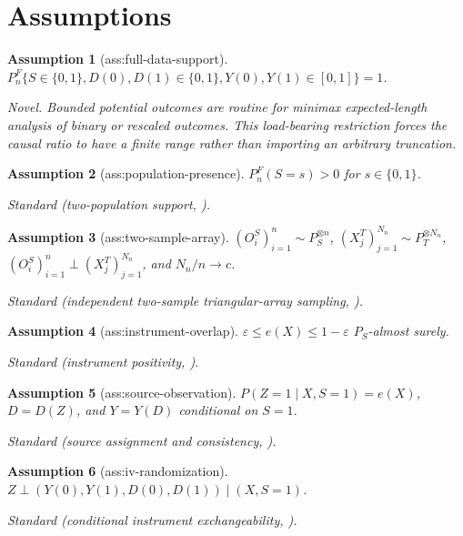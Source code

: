 \documentclass{article}
\newtheorem{assumption}{Assumption}
\begin{document}
\section{Assumptions}

\begin{assumption}[ass:full-data-support]\label{ass:full-data-support}
\(P_n^F\{S\in\{0,1\},D(0),D(1)\in\{0,1\},Y(0),Y(1)\in[0,1]\}=1\).
\par\smallskip\noindent\emph{Novel.} Bounded potential outcomes are routine for minimax expected-length analysis of binary or rescaled outcomes. This load-bearing restriction forces the causal ratio to have a finite range rather than importing an arbitrary truncation.
\end{assumption}

\begin{assumption}[ass:population-presence]\label{ass:population-presence}
\(P_n^F(S=s)>0\) for \(s\in\{0,1\}\).
\par\smallskip\noindent\emph{Standard} (two-population support, \cite{ChenHuang2025}).
\end{assumption}

\begin{assumption}[ass:two-sample-array]\label{ass:two-sample-array}
\((O_i^S)_{i=1}^n\sim P_S^{\otimes n}\), \((X_j^T)_{j=1}^{N_n}\sim P_T^{\otimes N_n}\), \((O_i^S)_{i=1}^n\perp(X_j^T)_{j=1}^{N_n}\), and \(N_n/n\to c\).
\par\smallskip\noindent\emph{Standard} (independent two-sample triangular-array sampling, \cite{ChenHuang2025}).
\end{assumption}

\begin{assumption}[ass:instrument-overlap]\label{ass:instrument-overlap}
\(\varepsilon\le e(X)\le1-\varepsilon\) \(P_S\)-almost surely.
\par\smallskip\noindent\emph{Standard} (instrument positivity, \cite{ChenHuang2025}).
\end{assumption}

\begin{assumption}[ass:source-observation]\label{ass:source-observation}
\(P(Z=1\mid X,S=1)=e(X)\), \(D=D(Z)\), and \(Y=Y(D)\) conditional on \(S=1\).
\par\smallskip\noindent\emph{Standard} (source assignment and consistency, \cite{ChenHuang2025}).
\end{assumption}

\begin{assumption}[ass:iv-randomization]\label{ass:iv-randomization}
\(Z\perp(Y(0),Y(1),D(0),D(1))\mid(X,S=1)\).
\par\smallskip\noindent\emph{Standard} (conditional instrument exchangeability, \cite{ChenHuang2025}).
\end{assumption}
\end{document}
